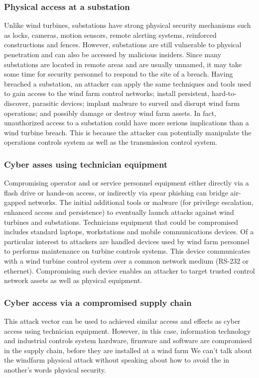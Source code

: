 \documentclass[twosided,a4,10pt]{article}
\begin{document}
\begin{multicols}{2}
 \subsubsection{Physical access at a substation}
 Unlike wind turbines, substations have strong physical security mechanisms such as locks, cameras, motion sensors, remote alerting systems, reinforced constructions and fences. However, substations are still vulnerable to physical penetration and can also be accessed by malicious insiders. Since many substations are located in remote areas and are usually unnamed, it may take some time for security personnel to respond to the site of a breach. Having breached a substation, an attacker can apply the same techniques and tools used to gain access to the wind farm control networks; install persistent, hard-to-discover, parasitic devices; implant malware to surveil and disrupt wind farm operations; and possibly damage or destroy wind farm assets. In fact, unauthorized access to a substation could have more serious implications than a wind turbine breach. This is because the attacker can potentially manipulate the operations controls system as well as the transmission control system.
 \subsubsection{Cyber asses using technician equipment}
 Compromising operator and or service personnel equipment either directly via a flash drive or hands-on access, or indirectly via spear phishing can bridge air-gapped networks. The initial additional tools or malware (for privilege escalation, enhanced access and persistence) to eventually launch attacks against wind turbines and substations. Technicians equipment that could be compromised includes standard laptops, workstations and mobile communications devices. Of a particular interest to attackers are handled devices used by wind farm personnel to performs maintenance on turbine controls systems. This device communicates with a wind turbine control system over a common network medium (RS-232 or ethernet). Compromising such device enables an attacker to target trusted control network assets as well as physical equipment.
 \subsubsection{Cyber access via a compromised supply chain}
 This attack vector can be used to achieved similar access and effects as cyber access using technician equipment. However, in this case, information technology and industrial controls system hardware, firmware and software are compromised in the supply chain, before they are installed at a wind farm
 \newline We can’t talk about the windfarm physical attack without speaking about how to avoid the in another’s words physical security.
 

\end{multicols}
\end{document}
